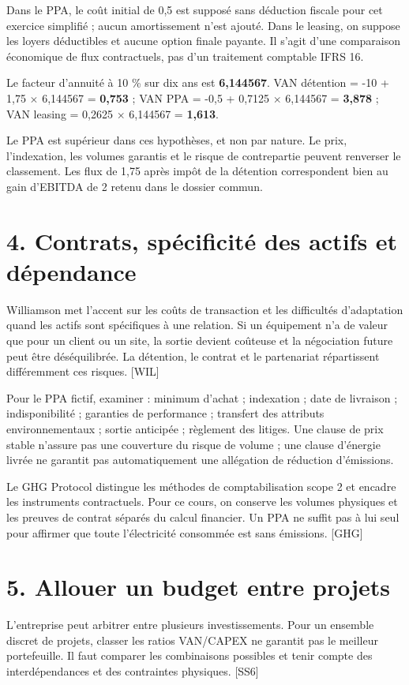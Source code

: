 \documentclass[12pt,a4paper]{article}
\begin{document}
Dans le PPA, le coût initial de 0,5 est supposé sans déduction fiscale pour cet exercice simplifié ; aucun amortissement n’est ajouté. Dans le leasing, on suppose les loyers déductibles et aucune option finale payante. Il s’agit d’une comparaison économique de flux contractuels, pas d’un traitement comptable IFRS 16.


Le facteur d’annuité à 10 \% sur dix ans est \textbf{6,144567}. VAN détention = -10 + 1,75 $\times$ 6,144567 = \textbf{0,753} ; VAN PPA = -0,5 + 0,7125 $\times$ 6,144567 = \textbf{3,878} ; VAN leasing = 0,2625 $\times$ 6,144567 = \textbf{1,613}.


Le PPA est supérieur dans ces hypothèses, et non par nature. Le prix, l’indexation, les volumes garantis et le risque de contrepartie peuvent renverser le classement. Les flux de 1,75 après impôt de la détention correspondent bien au gain d’EBITDA de 2 retenu dans le dossier commun.

\section*{4. Contrats, spécificité des actifs et dépendance}
Williamson met l’accent sur les coûts de transaction et les difficultés d’adaptation quand les actifs sont spécifiques à une relation. Si un équipement n’a de valeur que pour un client ou un site, la sortie devient coûteuse et la négociation future peut être déséquilibrée. La détention, le contrat et le partenariat répartissent différemment ces risques. [WIL]


Pour le PPA fictif, examiner : minimum d’achat ; indexation ; date de livraison ; indisponibilité ; garanties de performance ; transfert des attributs environnementaux ; sortie anticipée ; règlement des litiges. Une clause de prix stable n’assure pas une couverture du risque de volume ; une clause d’énergie livrée ne garantit pas automatiquement une allégation de réduction d’émissions.


Le GHG Protocol distingue les méthodes de comptabilisation scope 2 et encadre les instruments contractuels. Pour ce cours, on conserve les volumes physiques et les preuves de contrat séparés du calcul financier. Un PPA ne suffit pas à lui seul pour affirmer que toute l’électricité consommée est sans émissions. [GHG]

\section*{5. Allouer un budget entre projets}
L’entreprise peut arbitrer entre plusieurs investissements. Pour un ensemble discret de projets, classer les ratios VAN/CAPEX ne garantit pas le meilleur portefeuille. Il faut comparer les combinaisons possibles et tenir compte des interdépendances et des contraintes physiques. [SS6]
\end{document}
